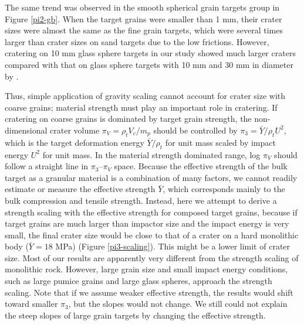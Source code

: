 \documentclass[3p,authoryear]{elsarticle}
\begin{document}
The same trend was observed in the smooth spherical grain targets group in Figure \ref{pi2-gb}. When the target grains were smaller than 1 mm, their crater sizes were almost the same as the fine grain targets, which were several times larger than crater sizes on sand targets due to the low frictions. However, cratering on 10 mm glass sphere targets in our study showed much larger craters compared with that on glass sphere targets with 10 mm and 30 mm in diameter by \citet{guettler2012}.

Thus, simple application of gravity scaling cannot account for crater size with coarse grains; material strength must play an important role in cratering. If cratering on coarse grains is dominated by target grain strength, the non-dimensional crater volume $\pi_V=\rho_t V_c/m_p$ should be controlled by $\pi_3=\bar{Y}/ \rho_t U^2$, which is the target deformation energy $\bar{Y}/\rho_t$ for unit mass scaled by impact energy $U^2$ for unit mass. In the material strength dominated range, log $\pi_V$ should follow a straight line in $\pi_3$--$\pi_V$ space. Because the effective strength of the bulk target as a granular material is a combination of many factors, we cannot readily estimate or measure the effective strength $\bar{Y}$, which corresponds mainly to the bulk compression and tensile strength.
Instead, here we attempt to derive a strength scaling with the effective strength for composed target grains, because if target grains are much larger than impactor size and the impact energy is very small, the final crater size would be close to that of a crater on a hard monolithic body ($\bar{Y}=18$ MPa) (Figure \ref{pi3-scaling}). This might be a lower limit of crater size.
Most of our results are apparently very different from the strength scaling of monolithic rock. However, large grain size and small impact energy conditions, such as large pumice grains and large glass spheres, approach the strength scaling. Note that if we assume weaker effective strength, the results would shift toward smaller $\pi_3$, but the slopes would not change. We still could not explain the steep slopes of large grain targets by changing the effective strength.
\end{document}
